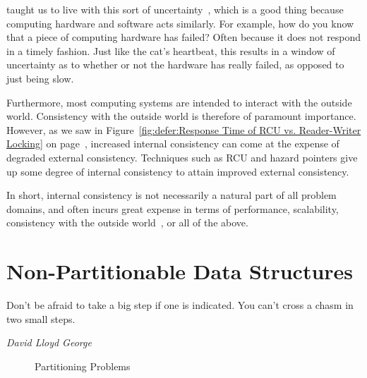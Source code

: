  taught us to live with this sort of
uncertainty~\cite{WeinerHeisenberg1927Uncertain}, which is a good
thing because computing hardware and software acts similarly.
For example, how do you know that a piece of computing hardware
has failed?
Often because it does not respond in a timely fashion.
Just like the cat's heartbeat, this results in a window of
uncertainty as to whether or not the hardware has really failed,
as opposed to just being slow.

Furthermore, most computing systems are intended to interact with
the outside world.
Consistency with the outside world is therefore of paramount importance.
However, as we saw in
Figure~\ref{fig:defer:Response Time of RCU vs. Reader-Writer Locking}
on
page~\pageref{fig:defer:Response Time of RCU vs. Reader-Writer Locking},
increased internal consistency can come at the expense of degraded
external consistency.
Techniques such as RCU and hazard pointers give up some degree of
internal consistency to attain improved external consistency.

In short, internal consistency is not necessarily a natural part of all
problem domains, and often incurs great expense in terms of performance,
scalability, consistency with the outside
world~\cite{AndreasHaas2012FIFOisnt,AndreasHaas2013CFRelaxedQueues,10.5555/3241639.3241645},
or all of the above.

\section{Non-Partitionable Data Structures}
\label{sec:datastruct:Non-Partitionable Data Structures}
%
\epigraph{Don't be afraid to take a big step if one is indicated.
	  You can't cross a chasm in two small steps.}
	 {\emph{David Lloyd George}}

\begin{figure}[tb]
\centering
{}
\caption{Partitioning Problems}
\end{figure}

